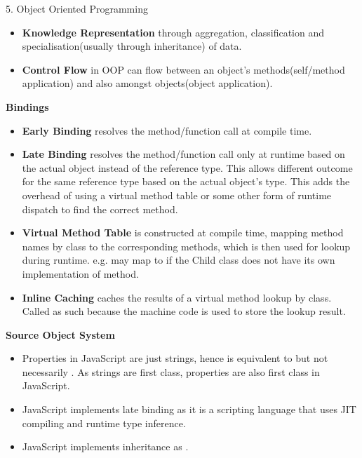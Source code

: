 \begin{center}
     \Large{5. Object Oriented Programming}
\end{center}

\begin{itemize}
    \item \textbf{Knowledge Representation} through aggregation, classification and specialisation(usually through inheritance) of data.
    \item \textbf{Control Flow} in OOP can flow between an object's methods(self/method application) and also amongst objects(object application).
\end{itemize}

\begin{center}
     \textbf{Bindings}
\end{center}
\begin{itemize}
    \item \textbf{Early Binding} resolves the method/function call at compile time.
    \item \textbf{Late Binding} resolves the method/function call only at runtime based on the actual object instead of the reference type. This allows different outcome for the same reference type based on the actual object's type. This adds the overhead of using a virtual method table or some other form of runtime dispatch to find the correct method.
    \item \textbf{Virtual Method Table} is constructed at compile time, mapping method names by class to the corresponding methods, which is then used for lookup during runtime. e.g.  may map to  if the Child class does not have its own implementation of method.
    \item \textbf{Inline Caching} caches the results of a virtual method lookup by class. Called as such  because the machine code is used to store the lookup result.
\end{itemize}

\begin{center}
     \textbf{Source Object System}
\end{center}
\begin{itemize}
    \item Properties in JavaScript are just strings, hence  is equivalent to  but not necessarily . As strings are first class, properties are also first class in JavaScript.
    \item JavaScript implements late binding as it is a scripting language that uses JIT compiling and runtime type inference.
    \item JavaScript implements inheritance  as .
\end{itemize}